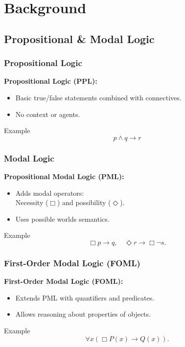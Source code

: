 \documentclass[aspectratio=169]{beamer}
\begin{document}

\section{Background}

\subsection{Propositional \& Modal Logic}
\begin{frame}
\frametitle{Propositional Logic}
    \Large 
    \textbf{Propositional Logic (PPL):}
    \begin{itemize}
        \item Basic true/false statements combined with connectives.
        \item No context or agents.
    \end{itemize}
    \begin{block}{Example}
        \[
        p \wedge q \rightarrow r
        \]
    \end{block}
\end{frame}

\begin{frame}
\frametitle{Modal Logic}
    \Large 
    \textbf{Propositional Modal Logic (PML):}
    \begin{itemize}
        \item Adds modal operators: \\
        Necessity ($\Box$) and possibility ($\Diamond$).
        \item Uses possible worlds semantics.
    \end{itemize}
    \begin{block}{Example}
        \[
        \Box p \rightarrow q, \quad
        \Diamond r \rightarrow \Box \neg s.
        \]
    \end{block}
\end{frame}

\begin{frame}
\frametitle{First-Order Modal Logic (FOML)}
    \Large 
    \textbf{First-Order Modal Logic (FOML):}
    \begin{itemize}
        \item Extends PML with quantifiers and predicates.
        \item Allows reasoning about properties of objects.
    \end{itemize}
    \begin{block}{Example}
        \[
        \forall x (\Box P(x) \rightarrow Q(x)).
        \]
    \end{block}
\end{frame}
\end{document}
